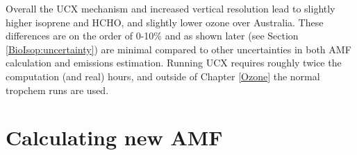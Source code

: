       
      Overall the UCX mechanism and increased vertical resolution lead to slightly higher isoprene and HCHO, and slightly lower ozone over Australia.
      These differences are on the order of 0-10\% and as shown later (see Section \ref{BioIsop:uncertainty}) are minimal compared to other uncertainties in both AMF calculation and emissions estimation.
      Running UCX requires roughly twice the computation (and real) hours, and outside of Chapter \ref{Ozone} the normal tropchem runs are used.
      
      
      
  

\section{Calculating new AMF}
  \label{Model:AMF}
  
